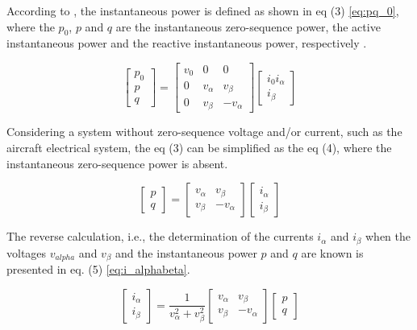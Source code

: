 According to \cite{Akagi}, the instantaneous power is defined as shown in eq (3) \ref{eq:pq_0}, where the $p_0$, $p$ and $q$ are the instantaneous zero-sequence power, the active instantaneous power and the reactive instantaneous power, respectively \cite{Akagi,Peng1996}.

\begin{equation}
\begin{bmatrix}
p_0\\
p\\
q
\end{bmatrix}=
\begin{bmatrix}
v_0		&	0			&	0\\
0		&	v_{\alpha}	&	v_{\beta}\\
0		&	v_{\beta}	&	-v_{\alpha}
\end{bmatrix}
\begin{bmatrix}
i_{0}
i_{\alpha}\\
i_{\beta}
\end{bmatrix}
\label{eq:pq_0}
\end{equation} 

Considering a system without zero-sequence voltage and/or current, such as the aircraft electrical system, the eq (3) can be simplified as the eq (4), where the instantaneous zero-sequence power is absent.

\begin{equation}
\begin{bmatrix}
p\\
q
\end{bmatrix}=
\begin{bmatrix}
v_{\alpha}	&	v_{\beta}\\
v_{\beta}	&	-v_{\alpha}
\end{bmatrix}
\begin{bmatrix}
i_{\alpha}\\
i_{\beta}
\end{bmatrix}
\label{eq:pq}
\end{equation} 

The reverse calculation, i.e., the determination of the currents $i_{\alpha}$ and $i_{\beta}$ when the voltages $v_{alpha}$ and $v_{\beta}$ and the instantaneous power $p$ and $q$ are known is presented in eq. (5) \ref{eq:i_alphabeta}.

\begin{equation}
\begin{bmatrix}
i_{\alpha}\\
i_{\beta}
\end{bmatrix}=
\dfrac{1}{v_{\alpha}^2+v_{\beta}^2}
\begin{bmatrix}
v_{\alpha}	&	v_{\beta}\\
v_{\beta}	&	-v_{\alpha}
\end{bmatrix}
\begin{bmatrix}
p\\
q
\end{bmatrix}
\label{eq:i_alphabeta}
\end{equation}

